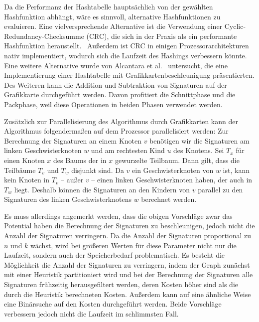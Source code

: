 Da die Performanz der Hashtabelle hauptsächlich von der gewählten Hashfunktion abhängt, wäre es sinnvoll, alternative Hashfunktionen zu evaluieren.
Eine vielversprechende Alternative ist die Verwendung einer Cyclic\hyp Redundancy\hyp Checksumme (CRC), die sich in der Praxis als ein performante Hashfunktion heraustellt.~\cite{MPL09, Hua+11}
Außerdem ist CRC in einigen Prozessorarchitekturen~\cite{SSE} nativ implementiert, wodurch sich die Laufzeit des Hashings verbessern könnte.
Eine weitere Alternative wurde von Alcantara et al.~\cite{Alc+09} untersucht, die eine Implementierung einer Hashtabelle mit Grafikkartenbeschleunigung präsentierten.
Des Weiteren kann die Addition und Subtraktion von Signaturen auf der Grafikkarte durchgeführt werden.
Davon profitiert die Schnittphase und die Packphase, weil diese Operationen in beiden Phasen verwendet werden.

Zusätzlich zur Parallelisierung des Algorithmus durch Grafikkarten kann der Algorithmus folgendermaßen auf dem Prozessor parallelisiert werden:
Zur Berechnung der Signaturen an einem Knoten $v$ benötigen wir die Signaturen am linken Geschwisterknoten $w$ und am rechtesten Kind $u$ des Knotens.
Sei $T_x$ für einen Knoten $x$ des Baums der in $x$ gewurzelte Teilbaum.
Dann gilt, dass die Teilbäume $T_v$ und $T_w$ disjunkt sind.
Da $v$ ein Geschwisterknoten von $w$ ist, kann kein Knoten in $T_v$ -- außer $v$ -- einen linken Geschwisterknoten haben, der auch in $T_w$ liegt.
Deshalb können die Signaturen an den Kindern von $v$ parallel zu den Signaturen des linken Geschwisterknotens $w$ berechnet werden.

Es muss allerdings angemerkt werden, dass die obigen Vorschläge zwar das Potential haben die Berechnung der Signaturen zu beschleunigen, jedoch nicht die Anzahl der Signaturen verringern.
Da die Anzahl der Signaturen proportional zu $n$ und $k$ wächst, wird bei größeren Werten für diese Parameter nicht nur die Laufzeit, sondern auch der Speicherbedarf problematisch.
Es besteht die Möglichkeit die Anzahl der Signaturen zu verringern, indem der Graph zunächst mit einer Heuristik partitioniert wird und bei der Berechnung der Signaturen alle Signaturen frühzeitig herausgefiltert werden, deren Kosten höher sind als die durch die Heuristik berechneten Kosten.
Außerdem kann auf eine ähnliche Weise eine Binärsuche auf den Kosten durchgeführt werden.
Beide Vorschläge verbessern jedoch nicht die Laufzeit im schlimmsten Fall.
